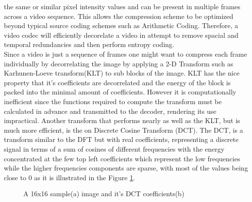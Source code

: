 \documentclass[a4paper,11pt,oneside]{article}
\begin{document}
the same or similar pixel intensity values and can be present in multiple frames across a video sequence. This allows the compression scheme to be optimized beyond typical source coding
schemes such as Arithmetic Coding. Therefore, a video codec will efficiently decorelate a video in attempt to remove spacial and temporal redundancies and then perform entropy coding.\\
\indent %
Since a video is just a sequence of frames one might want to compress each frame individually by decorrelating the image by applying a 2-D Transform such as Karhunen-Loeve transform(KLT) to sub blocks of the image. KLT has the nice property that it's coefficients are decorrelated and the energy of the block is packed into the minimal amount of coefficients. However it is computationally inefficient since the functions required to compute the transform must be calculated in advance and transmitted to the decoder, rendering its use impractical. Another transform that performs nearly as well as the KLT, but is much more efficient, is the on Discrete Cosine Transform (DCT). The DCT, is a transform similar to the DFT but with real
coefficients, representing a discrete signal in terms of a sum of cosines of different frequencies with the energy concentrated at the few top left coefficients which represent the low frequencies while the higher frequencies components are sparse, with most of the values being close to $0$ as it is illustrated in the Figure \ref{figure:DCTexample}.
\begin{figure}[h]
    \centering
    \qquad
    \caption{A 16x16 sample(a) image and it's DCT coefficients(b) \cite[p.~35]{richardson2002video}}
    \label{figure:DCTexample}
\end{figure} \\
\end{document}
